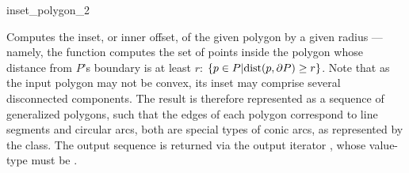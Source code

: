 
\ccRefPageBegin

\begin{ccRefFunction}{inset_polygon_2}


   {Computes the inset, or inner offset, of the given polygon  by a
    given radius  --- namely, the function computes the set of points
    inside the polygon whose distance from $P$'s boundary is at least $r$:
    $\{ p \in P \vert {\rm dist}(p, \partial P) \geq r \}$.
    Note that as the input polygon may not be convex, its inset may comprise
    several disconnected components. The result is therefore represented as a
    sequence of generalized polygons, such that the edges of each polygon
    correspond to line segments and circular arcs, both are special types of
    conic arcs, as represented by the  class.
    The output sequence is returned via the output iterator , whose
    value-type must be .
    }

\end{ccRefFunction}

\ccRefPageEnd
